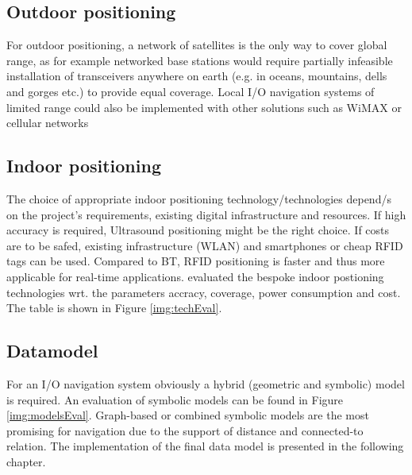 \subsection*{Outdoor positioning}
For outdoor positioning, a network of satellites is the only way to cover global range, as for example networked base stations would require partially infeasible installation of transceivers anywhere on earth (e.g. in oceans, mountains, dells and gorges etc.) to provide equal coverage. Local I/O navigation systems of limited range could also be implemented with other solutions such as WiMAX or cellular networks

\subsection*{Indoor positioning}
The choice of appropriate indoor positioning technology/technologies depend/s on the project's requirements, existing digital infrastructure and resources. If high accuracy is required, Ultrasound positioning might be the right choice. If costs are to be safed, existing infrastructure (WLAN) and smartphones or cheap RFID tags can be used. Compared to BT, RFID positioning is faster and thus more applicable for real-time applications. \cite{recentAdvances} evaluated the bespoke indoor postioning technologies wrt. the parameters accracy, coverage, power consumption and cost. The table is shown in Figure \ref{img:techEval}.


\subsection*{Datamodel}
For an I/O navigation system obviously a hybrid (geometric and symbolic) model is required. An evaluation of symbolic models can be found in Figure \ref{img:modelsEval}. Graph-based or combined symbolic models are the most promising for navigation due to the support of distance and connected-to relation.	The implementation of the final data model is presented in the following chapter.



